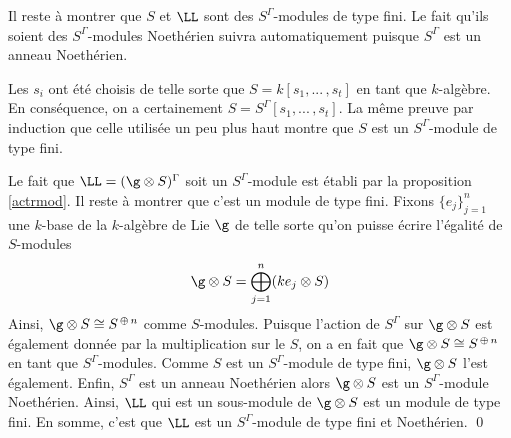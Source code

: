 \begin{Lem}
\begin{pre}
Il reste à montrer que $S$ et $\LL$ sont des $S^\Gamma$-modules de type fini. Le fait qu'ils soient des $S^\Gamma$-modules Noethérien suivra automatiquement puisque $S^\Gamma$ est un anneau Noethérien.

Les $s_i$ ont été choisis de telle sorte que $S = k[s_1,...\,,s_t]$ en tant que $k$-algèbre. En conséquence, on a certainement $S = S^\Gamma[s_1,...\,,s_t]$. La même preuve par induction que celle utilisée un peu plus haut montre que $S$ est un $S^\Gamma$-module de type fini.

Le fait que $\LL = (\g \otimes S)^\Gamma$ soit un $S^\Gamma$-module est établi par la proposition \ref{actrmod}. Il reste à montrer que c'est un module de type fini. Fixons $\{e_j\}_{j=1}^n$ une $k$-base de la $k$-algèbre de Lie $\g$ de telle sorte qu'on puisse écrire l'égalité de $S$-modules
$$ \g \otimes S = \bigoplus_{j=1}^n (ke_j \otimes S) $$
Ainsi, $\g \otimes S \cong S^{\,\oplus\, n}$ comme $S$-modules. Puisque l'action de $S^\Gamma$ sur $\g \otimes S$ est également donnée par la multiplication sur le $S$, on a en fait que $\g \otimes S \cong S^{\,\oplus\, n}$ en tant que $S^\Gamma$-modules. Comme $S$ est un $S^\Gamma$-module de type fini, $\g \otimes S$ l'est également. Enfin, $S^\Gamma$ est un anneau Noethérien alors $\g \otimes S$ est un $S^\Gamma$-module Noethérien. Ainsi, $\LL$ qui est un sous-module de $\g \otimes S$ est un module de type fini. En somme, c'est que $\LL$ est un $S^\Gamma$-module de type fini et Noethérien. \qed
\end{pre}
\end{Lem}

